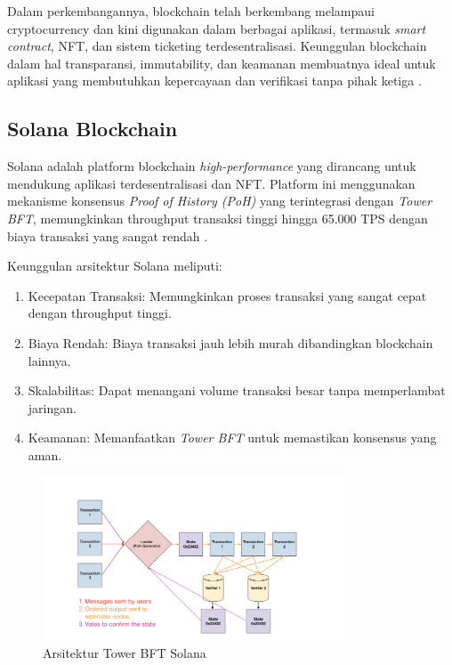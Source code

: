 Dalam perkembangannya, blockchain telah berkembang melampaui cryptocurrency dan kini digunakan dalam berbagai aplikasi, termasuk \textit{smart contract}, NFT, dan sistem ticketing terdesentralisasi. Keunggulan blockchain dalam hal transparansi, immutability, dan keamanan membuatnya ideal untuk aplikasi yang membutuhkan kepercayaan dan verifikasi tanpa pihak ketiga \parencite{ref3}.

\subsection{Solana Blockchain}
Solana adalah platform blockchain \textit{high-performance} yang dirancang untuk mendukung aplikasi terdesentralisasi dan NFT. Platform ini menggunakan mekanisme konsensus \textit{Proof of History (PoH)} yang terintegrasi dengan \textit{Tower BFT}, memungkinkan throughput transaksi tinggi hingga 65.000 TPS dengan biaya transaksi yang sangat rendah \parencite{ref9}.

Keunggulan arsitektur Solana meliputi:
\begin{enumerate}
    \item Kecepatan Transaksi: Memungkinkan proses transaksi yang sangat cepat dengan throughput tinggi.
    \item Biaya Rendah: Biaya transaksi jauh lebih murah dibandingkan blockchain lainnya.
    \item Skalabilitas: Dapat menangani volume transaksi besar tanpa memperlambat jaringan.
    \item Keamanan: Memanfaatkan \textit{Tower BFT} untuk memastikan konsensus yang aman.
\end{enumerate}

\begin{figure}[H]
    \centering
    \includegraphics[width=0.8\textwidth]{gambar/2.2.2.png}
    \caption{Arsitektur Tower BFT Solana \parencite{ref9}}
    \label{fig:solana-tower-bft}
\end{figure}


